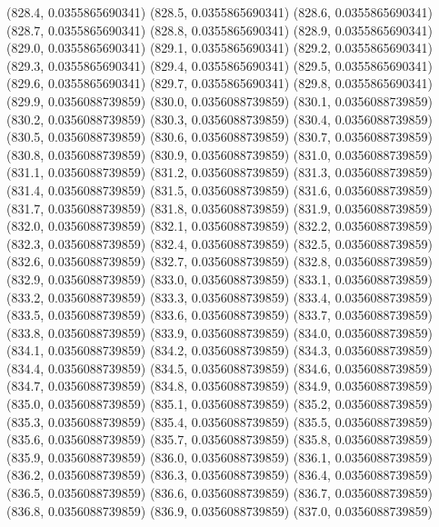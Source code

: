 {					(828.4, 0.0355865690341)
					(828.5, 0.0355865690341)
					(828.6, 0.0355865690341)
					(828.7, 0.0355865690341)
					(828.8, 0.0355865690341)
					(828.9, 0.0355865690341)
					(829.0, 0.0355865690341)
					(829.1, 0.0355865690341)
					(829.2, 0.0355865690341)
					(829.3, 0.0355865690341)
					(829.4, 0.0355865690341)
					(829.5, 0.0355865690341)
					(829.6, 0.0355865690341)
					(829.7, 0.0355865690341)
					(829.8, 0.0355865690341)
					(829.9, 0.0356088739859)
					(830.0, 0.0356088739859)
					(830.1, 0.0356088739859)
					(830.2, 0.0356088739859)
					(830.3, 0.0356088739859)
					(830.4, 0.0356088739859)
					(830.5, 0.0356088739859)
					(830.6, 0.0356088739859)
					(830.7, 0.0356088739859)
					(830.8, 0.0356088739859)
					(830.9, 0.0356088739859)
					(831.0, 0.0356088739859)
					(831.1, 0.0356088739859)
					(831.2, 0.0356088739859)
					(831.3, 0.0356088739859)
					(831.4, 0.0356088739859)
					(831.5, 0.0356088739859)
					(831.6, 0.0356088739859)
					(831.7, 0.0356088739859)
					(831.8, 0.0356088739859)
					(831.9, 0.0356088739859)
					(832.0, 0.0356088739859)
					(832.1, 0.0356088739859)
					(832.2, 0.0356088739859)
					(832.3, 0.0356088739859)
					(832.4, 0.0356088739859)
					(832.5, 0.0356088739859)
					(832.6, 0.0356088739859)
					(832.7, 0.0356088739859)
					(832.8, 0.0356088739859)
					(832.9, 0.0356088739859)
					(833.0, 0.0356088739859)
					(833.1, 0.0356088739859)
					(833.2, 0.0356088739859)
					(833.3, 0.0356088739859)
					(833.4, 0.0356088739859)
					(833.5, 0.0356088739859)
					(833.6, 0.0356088739859)
					(833.7, 0.0356088739859)
					(833.8, 0.0356088739859)
					(833.9, 0.0356088739859)
					(834.0, 0.0356088739859)
					(834.1, 0.0356088739859)
					(834.2, 0.0356088739859)
					(834.3, 0.0356088739859)
					(834.4, 0.0356088739859)
					(834.5, 0.0356088739859)
					(834.6, 0.0356088739859)
					(834.7, 0.0356088739859)
					(834.8, 0.0356088739859)
					(834.9, 0.0356088739859)
					(835.0, 0.0356088739859)
					(835.1, 0.0356088739859)
					(835.2, 0.0356088739859)
					(835.3, 0.0356088739859)
					(835.4, 0.0356088739859)
					(835.5, 0.0356088739859)
					(835.6, 0.0356088739859)
					(835.7, 0.0356088739859)
					(835.8, 0.0356088739859)
					(835.9, 0.0356088739859)
					(836.0, 0.0356088739859)
					(836.1, 0.0356088739859)
					(836.2, 0.0356088739859)
					(836.3, 0.0356088739859)
					(836.4, 0.0356088739859)
					(836.5, 0.0356088739859)
					(836.6, 0.0356088739859)
					(836.7, 0.0356088739859)
					(836.8, 0.0356088739859)
					(836.9, 0.0356088739859)
					(837.0, 0.0356088739859)
}
